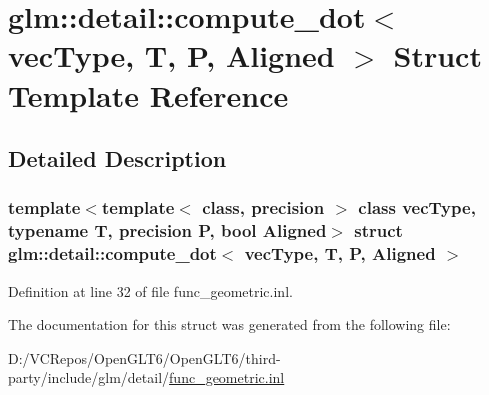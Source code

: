 \hypertarget{structglm_1_1detail_1_1compute__dot}{}\section{glm\+::detail\+::compute\+\_\+dot$<$ vec\+Type, T, P, Aligned $>$ Struct Template Reference}
\label{structglm_1_1detail_1_1compute__dot}


\subsection{Detailed Description}
\subsubsection*{template$<$template$<$ class, precision $>$ class vec\+Type, typename T, precision P, bool Aligned$>$\newline
struct glm\+::detail\+::compute\+\_\+dot$<$ vec\+Type, T, P, Aligned $>$}



Definition at line 32 of file func\+\_\+geometric.\+inl.



The documentation for this struct was generated from the following file\+:\begin{DoxyCompactItemize}
\item 
D\+:/\+V\+C\+Repos/\+Open\+G\+L\+T6/\+Open\+G\+L\+T6/third-\/party/include/glm/detail/\mbox{\hyperlink{func__geometric_8inl}{func\+\_\+geometric.\+inl}}\end{DoxyCompactItemize}
